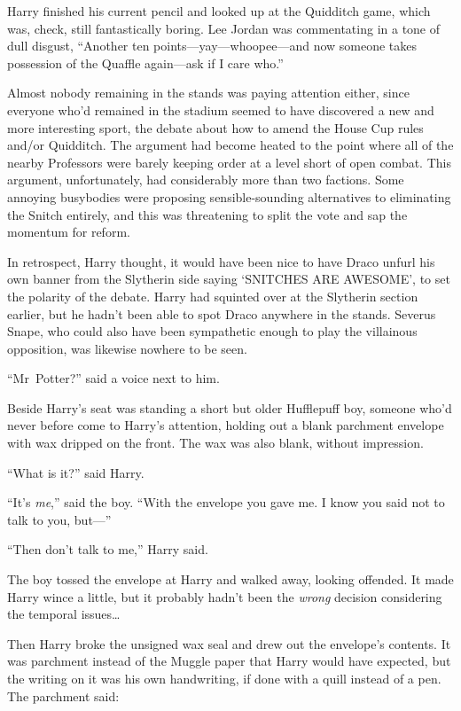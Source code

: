 Harry finished his current pencil and looked up at the Quidditch game, which was, check, still fantastically boring. Lee Jordan was commentating in a tone of dull disgust,
“Another ten points—yay—whoopee—and now someone takes possession of the Quaffle again—ask if I care who.”

Almost nobody remaining in the stands was paying attention either, since everyone who’d remained in the stadium seemed to have discovered a new and more interesting sport, the debate about how to amend the House Cup rules and/or Quidditch. The argument had become heated to the point where all of the nearby Professors were barely keeping order at a level short of open combat. This argument, unfortunately, had considerably more than two factions. Some annoying busybodies were proposing sensible-sounding alternatives to eliminating the Snitch entirely, and this was threatening to split the vote and sap the momentum for reform.

In retrospect, Harry thought, it would have been nice to have Draco unfurl his own banner from the Slytherin side saying ‘SNITCHES ARE AWESOME’, to set the polarity of the debate. Harry had squinted over at the Slytherin section earlier, but he hadn’t been able to spot Draco anywhere in the stands. Severus Snape, who could also have been sympathetic enough to play the villainous opposition, was likewise nowhere to be seen.

“Mr~Potter?” said a voice next to him.

Beside Harry’s seat was standing a short but older Hufflepuff boy, someone who’d never before come to Harry’s attention, holding out a blank parchment envelope with wax dripped on the front. The wax was also blank, without impression.

“What is it?” said Harry.

“It’s \emph{me},” said the boy.
“With the envelope you gave me. I know you said not to talk to you, but—”

“Then don’t talk to me,” Harry said.

The boy tossed the envelope at Harry and walked away, looking offended. It made Harry wince a little, but it probably hadn’t been the \emph{wrong} decision considering the temporal issues…

Then Harry broke the unsigned wax seal and drew out the envelope’s contents. It was parchment instead of the Muggle paper that Harry would have expected, but the writing on it was his own handwriting, if done with a quill instead of a pen. The parchment said:

